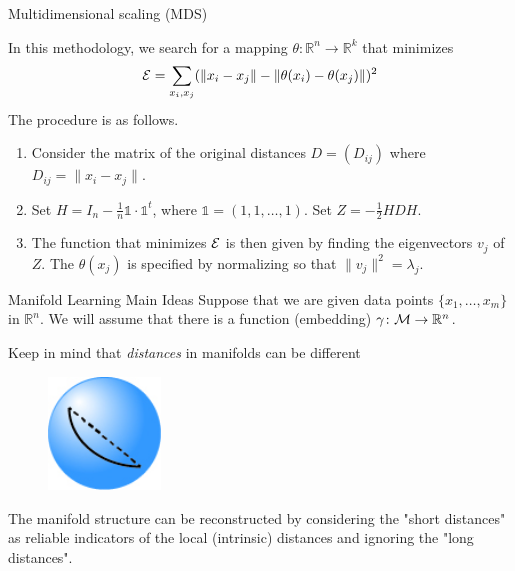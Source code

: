 \documentclass{beamer}
\begin{document}
\begin{frame}{Multidimensional scaling (MDS)}

In this methodology, we search for a mapping $\theta \colon \mathbb{R}^n \to \mathbb{R}^k$ that minimizes
\begin{equation*}
	{\cal E}= \sum_{x_i,x_j} ( \|x_i -x_j \| - \|\theta(x_i)-\theta(x_j)\|)^2
\end{equation*}
The procedure is as follows. 
\begin{enumerate}
	\item Consider the matrix of the original distances $D=(D_{ij})$ where $D_{ij}= \|x_i -x_j\|$. 
	\item Set $H= I_n - \frac{1}{n} \mathbb{1} \cdot \mathbb{1}^t$, where $\mathbb{1}= (1,1, \ldots, 1)$. Set $Z= -\frac{1}{2} H D H$.
	\item The function that minimizes $\cal E$ is then given by finding the eigenvectors $v_j$ of $Z$. The $\theta(x_j)$ is specified by normalizing so that $\|v_j\|^2=\lambda_j$.
\end{enumerate}
\end{frame}

\begin{frame}{Manifold Learning Main Ideas}
	Suppose that we are given data points $\{x_1, \ldots, x_m\}$ in $\mathbb{R}^n$. We will assume that there is a function (embedding) $\gamma \colon {\cal M} \to \mathbb{R}^n$. 
	
	Keep in mind that \textit{distances} in manifolds can be different
\begin{figure}[h]
	\centering
	\includegraphics[width=3cm]{../../Figures/fig_geodesic.jpg}
\end{figure}
	The manifold structure can be reconstructed by considering the "short distances" as reliable indicators of the local (intrinsic) distances and ignoring the "long distances".
	

\end{frame}
\end{document}
